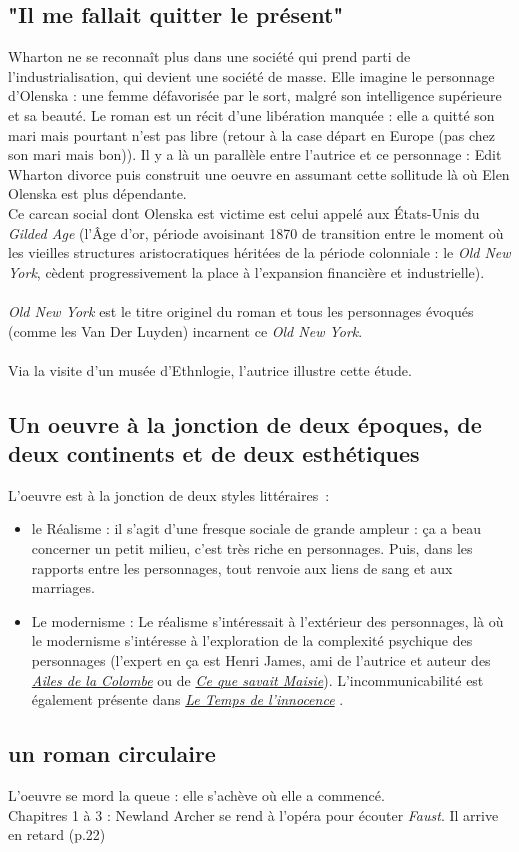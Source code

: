 \documentclass[a4paper,12pt]{article}
\newcommand{\lti}{\underline{\textit{Le Temps de l'innocence}} }
\begin{document}
\subsection{"Il me fallait quitter le présent"}
Wharton ne se reconnaît plus dans une société qui prend parti de l'industrialisation, qui devient une société de masse. Elle imagine le personnage d'Olenska : une femme défavorisée par le sort, malgré son intelligence supérieure et sa beauté. Le roman est un récit d'une libération manquée : elle a quitté son mari mais pourtant n'est pas libre (retour à la case départ en Europe (pas chez son mari mais bon)). Il y a là un parallèle entre l'autrice et ce personnage : Edit Wharton divorce puis construit une oeuvre en assumant cette sollitude là où Elen Olenska est plus dépendante.\\
Ce carcan social dont Olenska est victime est celui appelé aux États-Unis du \textit{Gilded Age} (l'Âge d'or, période avoisinant 1870 de transition entre le moment où les vieilles structures aristocratiques héritées de la période colonniale : le \textit{Old New York}, cèdent progressivement la place à l'expansion financière et industrielle).\\\\
\textit{Old New York} est le titre originel du roman et tous les personnages évoqués (comme les Van Der Luyden) incarnent ce \textit{Old New York}.\\\\
Via la visite d'un musée d'Ethnlogie, l'autrice illustre cette étude.

\subsection{Un oeuvre à la jonction de deux époques, de deux continents et de deux esthétiques}

L'oeuvre est à la jonction de deux styles littéraires~:
\begin{itemize}
    \item le Réalisme : il s'agit d'une fresque sociale de grande ampleur : ça a beau concerner un petit milieu, c'est très riche en personnages. Puis, dans les rapports entre les personnages, tout renvoie aux liens de sang et aux marriages.
    \item Le modernisme : Le réalisme s'intéressait à l'extérieur des personnages, là où le modernisme s'intéresse à l'exploration de la complexité psychique des personnages (l'expert en ça est Henri James, ami de l'autrice et auteur des \textit{\underline{Ailes de la Colombe}} ou de \textit{\underline{Ce que savait Maisie}}). L'incommunicabilité est également présente dans \lti.
\end{itemize}



\subsection{un roman circulaire}
L'oeuvre se mord la queue : elle s'achève où elle a commencé.\\
Chapitres 1 à 3 : Newland Archer se rend à l'opéra pour écouter \textit{Faust}. Il arrive en retard (p.22)

\subsection{}
\end{document}
